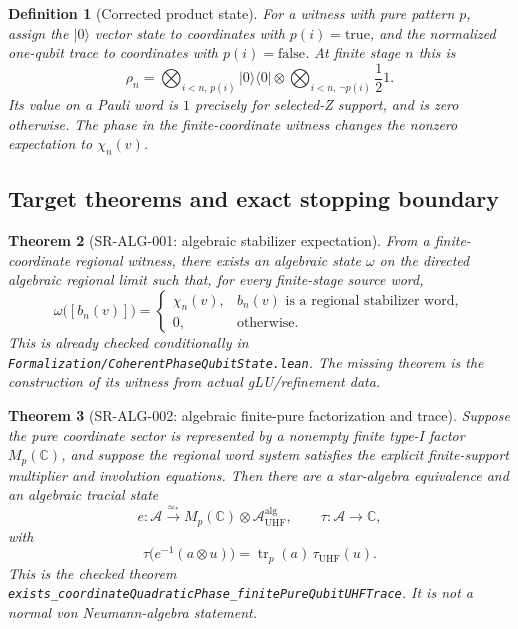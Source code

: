\documentclass{article}
\newtheorem{definition}{Definition}
\newtheorem{theorem}[definition]{Theorem}
\newcommand{\cA}{\mathcal A}
\begin{document}
\begin{definition}[Corrected product state]
For a witness with pure pattern \(p\), assign the \(\lvert0\rangle\) vector
state to coordinates with \(p(i)=\mathrm{true}\), and the normalized
one-qubit trace to coordinates with \(p(i)=\mathrm{false}\).  At finite stage
\(n\) this is
\begin{equation}
 \rho_n=\bigotimes_{i<n,\,p(i)}\lvert0\rangle\langle0\rvert
 \otimes
 \bigotimes_{i<n,\,\neg p(i)}\frac{1}{2}1.
 \label{eq:pure_mixed_state}
\end{equation}
Its value on a Pauli word is \(1\) precisely for selected-Z support, and is
zero otherwise.  The phase in the finite-coordinate witness changes the
nonzero expectation to \(\chi_n(v)\).
\end{definition}

\subsection*{Target theorems and exact stopping boundary}

\begin{theorem}[SR-ALG-001: algebraic stabilizer expectation]
From a finite-coordinate regional witness, there exists an algebraic state
\(\omega\) on the directed algebraic regional limit such that, for every
finite-stage source word,
\begin{equation}
 \omega\bigl([b_n(v)]\bigr)=
 \begin{cases}
   \chi_n(v),& b_n(v)\text{ is a regional stabilizer word},\\
   0,&\text{otherwise}.
 \end{cases}
 \label{eq:regional_expectation}
\end{equation}
This is already checked conditionally in
\texttt{Formalization/CoherentPhaseQubitState.lean}.  The missing theorem is
the construction of its witness from actual gLU/refinement data.
\end{theorem}

\begin{theorem}[SR-ALG-002: algebraic finite-pure factorization and trace]
Suppose the pure coordinate sector is represented by a nonempty finite type-I
factor \(M_p(\mathbb C)\), and suppose the regional word system satisfies the
explicit finite-support multiplier and involution equations.  Then there are
a star-algebra equivalence and an algebraic tracial state
\begin{equation}
 e:\cA\overset{\simeq_*}{\longrightarrow}
 M_p(\mathbb C)\otimes\cA_{\mathrm{UHF}}^{\mathrm{alg}},
 \qquad
 \tau:\cA\to\mathbb C,
\end{equation}
with
\begin{equation}
 \tau\bigl(e^{-1}(a\otimes u)\bigr)
 =\operatorname{tr}_p(a)\,\tau_{\mathrm{UHF}}(u).
 \label{eq:algebraic_trace_factorization}
\end{equation}
This is the checked theorem
\texttt{exists\_coordinateQuadraticPhase\_finitePureQubitUHFTrace}.  It is
not a normal von Neumann-algebra statement.
\end{theorem}
\end{document}
